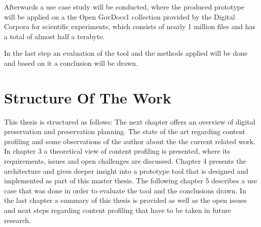Afterwards a use case study will be conducted, where the produced prototype will be applied on a the Open GovDocs1 collection provided by the Digital Corpora for scientific experiments, which consists of nearly 1 million files and has a total of almost half a terabyte. 

In the last step an evaluation of the tool and the methods applied will be done and based on it a conclusion will be drawn.

\section{Structure Of The Work}
This thesis is structured as follows: The next chapter offers an overview of digital preservation and preservation planning. The state of the art regarding content profiling and some observations of the author about the the current related work. In chapter 3 a theoretical view of content profiling is presented, where its requirements, issues and open challenges are discussed. Chapter 4 presents the architecture and gives deeper insight into a prototype tool that is designed and implemented as part of this master thesis. The following chapter 5 describes a use case that was done in order to evaluate the tool and the conclusions drawn. In the last chapter a summary of this thesis is provided as well as the open issues and next steps regarding content profiling that have to be taken in future research.
